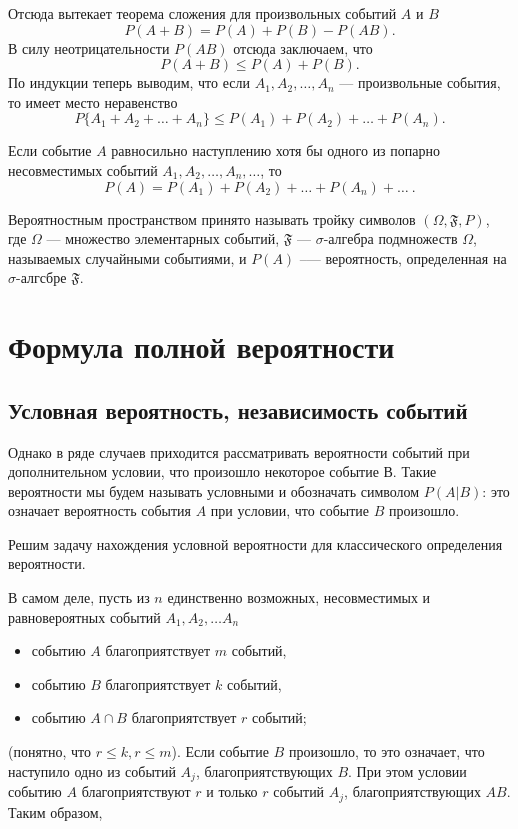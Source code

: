 Отсюда вытекает теорема сложения для произвольных событий $A$ и $B$
$$
P(A + B) = P(A) + P(B) - P(AB).
$$
В силу неотрицательности $P(AB)$ отсюда заключаем, что
$$
P(A + B) \le P(A) + P(B).
$$
По индукции теперь выводим, что если $A_1,A_2, \ldots,A_n$ --- произвольные события, то имеет место неравенство
$$
P\{ A_1 + A_2 + \ldots + A_n \} \le P(A_1) + P(A_2) + \ldots + P(A_n).
$$
\begin{axiome}
 Если событие $A$ равносильно наступлению хотя бы одного из попарно несовместимых событий $A_1,A_2,\ldots,A_n,\ldots$, то
$$
P(A) = P(A_1) + P(A_2) + \ldots + P(A_n) + \ldots \: .
$$
\end{axiome}
Вероятностным пространством принято называть тройку символов $(\Omega, \mathfrak{F}, P)$, где $\Omega$ --- множество элементарных событий, $\mathfrak{F}$ — $\sigma$-алгебра подмножеств $\Omega$, называемых случайными событиями, и $P(A)$ --— вероятность, определенная на $\sigma$-алгсбре $\mathfrak{F}$.

\section{Формула полной вероятности}
\subsection{Условная вероятность, независимость событий}

Однако в ряде случаев приходится рассматривать вероятности событий при дополнительном условии, что произошло некоторое событие В. Такие вероятности мы будем называть условными и обозначать символом $P(A|B)$: это означает вероятность события $A$ при условии, что событие $B$ произошло.
 
Решим задачу нахождения условной вероятности для классического определения вероятности.

В самом деле, пусть из $n$ единственно возможных, несовместимых и равновероятных событий $A_1,A_2,\dots A_n$
\begin{itemize}
\item событию $A$ благоприятствует $m$ событий, 
\item событию $B$ благоприятствует $k$ событий,
\item событию $A\cap B$ благоприятствует $r$ событий;
\end{itemize}

(понятно, что $r \le k, r \le m$). Если событие $B$ произошло, то это означает, что наступило одно из событий $A_j$, благоприятствующих $B$. При этом условии событию $A$ благоприятствуют $r$ и только $r$ событий $A_j$, благоприятствующих $AB$. Таким образом,


